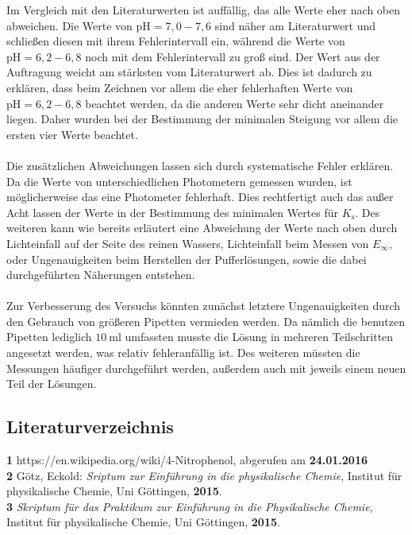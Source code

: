 \documentclass[12pt,a4paper,titlepage,headinclude,bibtotoc]{scrartcl}
\begin{document}
Im Vergleich mit den Literaturwerten ist auffällig, das alle Werte eher nach oben abweichen. Die Werte von $ \mathrm{pH} = 7,0- 7,6$ sind näher am Literaturwert und schließen diesen mit ihrem Fehlerintervall ein, während die Werte von $ \mathrm{pH} = 6,2- 6,8$ noch mit dem Fehlerintervall zu groß sind. Der Wert aus der Auftragung weicht am stärksten vom Literaturwert ab. Dies ist dadurch zu erklären, dass beim Zeichnen vor allem die eher fehlerhaften Werte von $ \mathrm{pH} = 6,2- 6,8$ beachtet werden, da die anderen Werte sehr dicht aneinander liegen. Daher wurden bei der Bestimmung der minimalen Steigung vor allem die ersten vier Werte beachtet.\\\\
Die zusätzlichen Abweichungen lassen sich durch systematische Fehler erklären. Da die Werte von unterschiedlichen Photometern gemessen wurden, ist möglicherweise das eine Photometer fehlerhaft. Dies rechtfertigt auch das außer Acht lassen der Werte in der Bestimmung des minimalen Wertes für $K_{\mathrm{s}}$. Des weiteren  kann wie bereits erläutert eine Abweichung der Werte nach oben durch Lichteinfall auf der Seite des reinen Wassers, Lichteinfall beim Messen von $E_{\infty}$, oder Ungenauigkeiten beim Herstellen der Pufferlösungen, sowie die dabei durchgeführten Näherungen entstehen.\\\\
Zur Verbesserung des Versuchs könnten zunächst letztere Ungenauigkeiten durch den Gebrauch von größeren Pipetten vermieden werden. Da nämlich die benutzen Pipetten lediglich $10{~} \mathrm{ml}$ umfassten musste die Lösung in mehreren Teilschritten angesetzt werden, was relativ fehleranfällig ist. Des weiteren müssten die Messungen häufiger durchgeführt werden, außerdem auch mit jeweils einem neuen Teil der Lösungen.
 
\newpage
\subsection{Literaturverzeichnis}
\textbf{1} https://en.wikipedia.org/wiki/4-Nitrophenol, abgerufen am \textbf{24.01.2016}\\
\textbf{2} Götz, Eckold: \emph{Sriptum zur Einführung in die physikalische Chemie}, Institut für physikalische Chemie, Uni Göttingen, \textbf{2015}.\\
\textbf{3} \emph{Skriptum für das Praktikum zur Einführung in die Physikalische Chemie}, Institut für physikalische Chemie, Uni Göttingen, \textbf{2015}.\\
\end{document}
